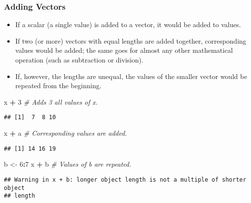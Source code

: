 \documentclass[
]{book}
\newenvironment{Shaded}{\begin{snugshade}}{\end{snugshade}}
\newcommand{\CommentTok}[1]{\textcolor[rgb]{0.56,0.35,0.01}{\textit{#1}}}
\newcommand{\DecValTok}[1]{\textcolor[rgb]{0.00,0.00,0.81}{#1}}
\newcommand{\NormalTok}[1]{#1}
\newcommand{\OperatorTok}[1]{\textcolor[rgb]{0.81,0.36,0.00}{\textbf{#1}}}
\newcommand{\StringTok}[1]{\textcolor[rgb]{0.31,0.60,0.02}{#1}}
\begin{document}
\hypertarget{adding-vectors}{%
\subsubsection{Adding Vectors}\label{adding-vectors}}

\begin{itemize}
\item
  If a scalar (a single value) is added to a vector, it would be added to values.
\item
  If two (or more) vectors with equal lengths are added together, corresponding values would be added; the same goes for almost any other mathematical operation (such as subtraction or division).
\item
  If, however, the lengths are unequal, the values of the smaller vector would be repeated from the beginning.
\end{itemize}

\begin{Shaded}
\begin{Highlighting}[]
\NormalTok{x }\OperatorTok{+}\StringTok{ }\DecValTok{3} \CommentTok{# Adds 3 all values of x.}
\end{Highlighting}
\end{Shaded}

\begin{verbatim}
## [1]  7  8 10
\end{verbatim}

\begin{Shaded}
\begin{Highlighting}[]
\NormalTok{x }\OperatorTok{+}\StringTok{ }\NormalTok{a }\CommentTok{# Corresponding values are added.}
\end{Highlighting}
\end{Shaded}

\begin{verbatim}
## [1] 14 16 19
\end{verbatim}

\begin{Shaded}
\begin{Highlighting}[]
\NormalTok{b <-}\StringTok{ }\DecValTok{6}\OperatorTok{:}\DecValTok{7}
\NormalTok{x }\OperatorTok{+}\StringTok{ }\NormalTok{b }\CommentTok{# Values of b are repeated. }
\end{Highlighting}
\end{Shaded}

\begin{verbatim}
## Warning in x + b: longer object length is not a multiple of shorter object
## length
\end{verbatim}
\end{document}
